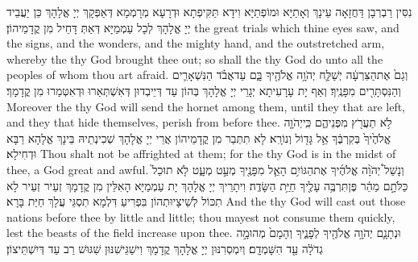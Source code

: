 {נִסִּין רַבְרְבָן דַּחֲזָאָה עֵינָךְ וְאָתַיָּא וּמוֹפְתַיָּא וִידָא תַּקִּיפְתָא וּדְרָעָא מְרָמְמָא דְּאַפְּקָךְ יְיָ אֱלָהָךְ כֵּן יַעֲבֵיד יְיָ אֱלָהָךְ לְכָל עַמְמַיָּא דְּאַתְּ דָּחֵיל מִן קֳדָמֵיהוֹן׃}
{the great trials which thine eyes saw, and the signs, and the wonders, and the mighty hand, and the outstretched arm, whereby the \lord\space thy God brought thee out; so shall the \lord\space thy God do unto all the peoples of whom thou art afraid.}{}
{וְגַם֙ אֶת\maqqaf הַצִּרְעָ֔ה יְשַׁלַּ֛ח יְהֹוָ֥ה אֱלֹהֶ֖יךָ בָּ֑ם עַד\maqqaf אֲבֹ֗ד הַנִּשְׁאָרִ֛ים וְהַנִּסְתָּרִ֖ים מִפָּנֶֽיךָ׃}
{וְאַף יָת עָרָעִיתָא יְגָרֵי יְיָ אֱלָהָךְ בְּהוֹן עַד דְּיֵיבְדוּן דְּאִשְׁתְּאַרוּ וּדְאִטְּמַרוּ מִן קֳדָמָךְ׃}
{Moreover the \lord\space thy God will send the hornet among them, until they that are left, and they that hide themselves, perish from before thee.}{}
{לֹ֥א תַעֲרֹ֖ץ מִפְּנֵיהֶ֑ם כִּֽי\maqqaf יְהֹוָ֤ה אֱלֹהֶ֙יךָ֙ בְּקִרְבֶּ֔ךָ אֵ֥ל גָּד֖וֹל וְנוֹרָֽא׃}
{לָא תִתְּבַר מִן קֳדָמֵיהוֹן אֲרֵי יְיָ אֱלָהָךְ שְׁכִינְתֵיהּ בֵּינָךְ אֱלָהָא רַבָּא וּדְחִילָא׃}
{Thou shalt not be affrighted at them; for the \lord\space thy God is in the midst of thee, a God great and awful.}{}
{וְנָשַׁל֩ יְהֹוָ֨ה אֱלֹהֶ֜יךָ אֶת\maqqaf הַגּוֹיִ֥ם הָאֵ֛ל מִפָּנֶ֖יךָ מְעַ֣ט מְעָ֑ט לֹ֤א תוּכַל֙ כַּלֹּתָ֣ם מַהֵ֔ר פֶּן\maqqaf תִּרְבֶּ֥ה עָלֶ֖יךָ חַיַּ֥ת הַשָּׂדֶֽה׃}
{וִיתָרֵיךְ יְיָ אֱלָהָךְ יָת עַמְמַיָּא הָאִלֵּין מִן קֳדָמָךְ זְעֵיר זְעֵיר לָא תִכּוֹל לְשֵׁיצָיוּתְהוֹן בִּפְרִיעַ דִּלְמָא תִסְגֵּי עֲלָךְ חַיַּת בָּרָא׃}
{And the \lord\space thy God will cast out those nations before thee by little and little; thou mayest not consume them quickly, lest the beasts of the field increase upon thee.}{}
{וּנְתָנָ֛ם יְהֹוָ֥ה אֱלֹהֶ֖יךָ לְפָנֶ֑יךָ וְהָמָם֙ מְהוּמָ֣ה גְדֹלָ֔ה עַ֖ד הִשָּׁמְדָֽם׃}
{וְיִמְסְרִנּוּן יְיָ אֱלָהָךְ קֳדָמָךְ וִישַׁגֵּישִׁנּוּן שִׁגּוּשׁ רַב עַד דְּיִשְׁתֵּיצוֹן׃}
